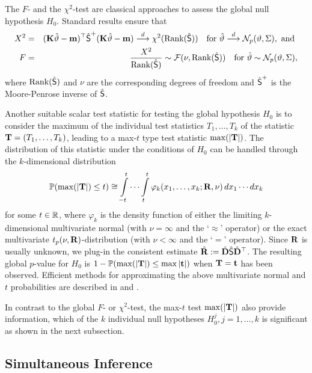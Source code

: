 \documentclass[12pt]{article}
\begin{document}
The $F$- and the $\chi^2$-test are classical approaches to assess the global null hypothesis $H_0$.
Standard results ensure that
\begin{eqnarray*}
X^2 & = & (\K \hat{\vartheta} - \m)^\top \hat{\S}^+ (\K \hat{\vartheta} - \m) \cL \chi^2(\Rg(\hat{\S}))
\quad \text{for } \hat{\vartheta} \cL \N_p(\vartheta, \Sigma), \text{ and }  \\
F & = &  \frac{X^2}{\Rg(\hat{\S})} \sim \F(\nu, \Rg(\hat{\S})) \quad \text{for }
\hat{\vartheta} \sim \N_p(\vartheta, \Sigma),
\end{eqnarray*}
where $\Rg(\hat{\S})$ and $\nu$ are the corresponding degrees of freedom and $\hat{\S}^+$
is the Moore-Penrose inverse of $\hat{\S}$.


Another suitable scalar test statistic for testing the global hypothesis
$H_0$ is to consider the maximum of the individual test statistics
$T_1, \dots, T_k$ of the statistic 
$\T = (T_1, \dots, T_k)$, leading to a max-$t$ type test statistic $\max(|\T|)$.
The distribution of this statistic under the conditions of $H_0$
can be handled through the $k$-dimensional distribution
\begin{eqnarray}
\label{maxt}
\Prob(\max(|\T|) \le t)  \cong  \int\limits_{-t}^t \cdots \int\limits_{t}^t
\varphi_k(x_1, \dots, x_k; \Cor, \nu) \, dx_1 \cdots dx_k
\end{eqnarray}
for some $t \in \R$, where $\varphi_k$ is the density function of either the limiting
$k$-dimensional multivariate
normal (with $\nu = \infty$ and the `$\approx$' operator) or the exact multivariate $t_p(\nu,
\Cor)$-distribution (with $\nu < \infty$ and the `$=$' operator).
Since $\Cor$ is usually unknown, we plug-in the consistent estimate
$\hat{\Cor} := \hat{\D} \hat{\S} \hat{\D}^\top$.
The resulting global $p$-value for $H_0$ is $1 - \Prob(\max(|\T|) \le \max|\tt|)$
when $\T = \tt$ has been observed.
Efficient methods
for approximating the above multivariate normal and $t$
probabilities are described in \cite{Genz1992,GenzBretz1999,BretzGenzHothorn2001}
and \cite{GenzBretz2002}.

In contrast to the global $F$- or $\chi^2$-test,
the max-$t$ test $\max(|\T|)$ also provide information,
which of the $k$ individual null hypotheses $H_0^j, j = 1, \dots, k$
is significant as shown in the next subsection.

\subsection{Simultaneous Inference} \label{simtest}
\end{document}
